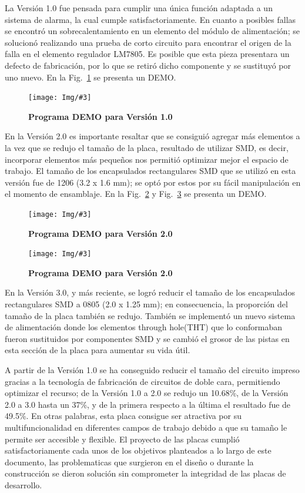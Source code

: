 \documentclass[times, 10pt,twocolumn]{article}
\newcommand{\Img}[5]{
   \begin{figure}[H]
   	   \centering
       \texttt{[image: Img/\#3]}
       \caption{ \centering \textbf{\small #4}}
       \label{#5}
   
       \end{figure}
   }
\begin{document}
La Versión 1.0 fue pensada para cumplir una única función adaptada a un sistema de alarma, la cual cumple satisfactoriamente. En cuanto a posibles fallas se encontró un sobrecalentamiento en un elemento del módulo de alimentación; se solucionó realizando una prueba de corto circuito para encontrar el origen de la falla en el elemento regulador LM7805. Es posible que esta pieza presentara un defecto de fabricación, por lo que se retiró dicho componente y se sustituyó por uno nuevo. En la Fig.~\ref{fig:12} se presenta un DEMO.
\Img{8.5cm}{7.0cm}{primera_version_demo}{Programa DEMO para Versión 1.0}{fig:12}
En la Versión 2.0 es importante resaltar que se consiguió agregar más elementos a la vez que se redujo el tamaño de la placa, resultado de utilizar SMD, es decir, incorporar elementos más pequeños nos permitió optimizar mejor el espacio de trabajo. El tamaño de los encapsulados rectangulares SMD que se utilizó en esta versión fue de 1206 (3.2 x 1.6
mm); se optó por estos por su fácil manipulación en el momento de ensamblaje. En la Fig.~\ref{fig:13} y Fig.~\ref{fig:14} se presenta un DEMO.
\Img{8.5cm}{7.0cm}{segunda_version_demoa}{Programa DEMO para Versión 2.0}{fig:13}
\Img{8.5cm}{7.0cm}{segunda_version_demob}{Programa DEMO para Versión 2.0}{fig:14}

En la Versión 3.0, y más reciente, se logró reducir el tamaño de los encapsulados rectangulares SMD a 0805 (2.0 x 1.25 mm); en consecuencia, la proporción del tamaño de la placa también se redujo. También se implementó un nuevo sistema de alimentación donde los elementos through hole(THT) que lo conformaban fueron sustituidos por componentes SMD y se cambió el grosor de las pistas en esta sección de la placa para aumentar su vida útil.

A partir de la Versión 1.0 se ha conseguido reducir el tamaño del circuito impreso gracias a la tecnología de fabricación de circuitos de doble cara, permitiendo optimizar el recurso; de la Versión 1.0 a 2.0 se redujo un 10.68\%, de la Versión 2.0 a 3.0 hasta un 37\%, y de la primera respecto a la última el resultado fue de 49.5\%. En otras palabras, esta placa consigue ser atractiva por su multifuncionalidad en diferentes campos de trabajo debido a que su tamaño le permite ser accesible y flexible.
 El proyecto de las placas cumplió satisfactoriamente cada unos de los objetivos planteados a lo largo de este documento, las problematicas que surgieron en el diseño o durante la construcción se dieron solución sin comprometer la integridad de las placas de desarrollo.
\end{document}
